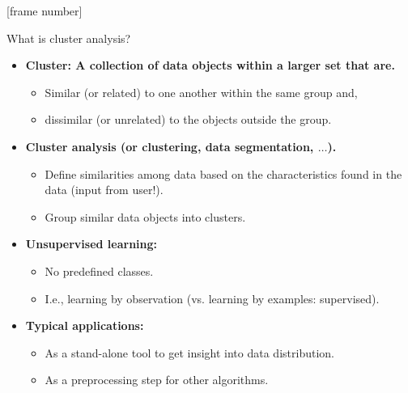 \documentclass[aspectratio=169,t,xcolor=dvipsnames]{beamer}
\begin{document}
  {
    [frame number]
    \begin{frame}{What is cluster analysis?}
        \begin{itemize}
          \item \textbf{{\color{airforceblue}Cluster}: A collection of data objects within a larger set that are.}
          \begin{itemize}
            \item {\color{airforceblue}Similar (or related)} to one another within the same group and,
            \item dissimilar (or unrelated) to the objects outside the group.
          \end{itemize}
          \item \textbf{{\color{airforceblue}Cluster analysis} (or clustering, data segmentation, $\ldots$).}
          \begin{itemize}
            \item {\color{airforceblue}Define similarities} among data based on the characteristics found in the data (input from user!).
            \item Group similar data objects into clusters.
          \end{itemize}
          \item \textbf{Unsupervised learning:}
          \begin{itemize}
            \item No predefined classes.
            \item I.e., learning by observation (vs. learning by examples: supervised).
          \end{itemize}
          \item \textbf{Typical applications:}
          \begin{itemize}
            \item As a stand-alone tool to get insight into data distribution.
            \item As a preprocessing step for other algorithms.
          \end{itemize}
        \end{itemize}
    \end{frame}
  }
\end{document}
